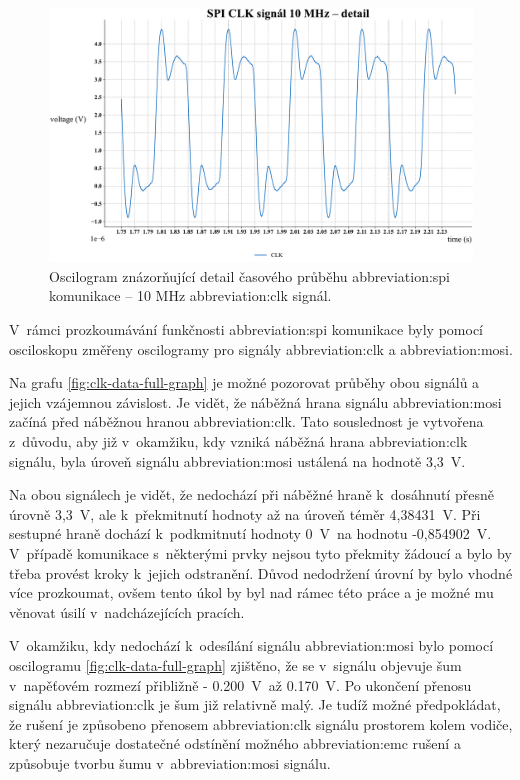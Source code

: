 \documentclass[a4paper, twoside, 11pt]{article}
\begin{document}
	\begin{figure}[htbp!]
		\centering
		\includegraphics[width=1\textwidth]{src/python-graph/spi-osciloscope-data/pdf/clk-mid-graph.pdf}
		\caption{Oscilogram znázorňující detail časového průběhu \gls{abbreviation:spi} komunikace – 10 MHz \gls{abbreviation:clk} signál.}
		\label{fig:clk-mid-graph}
	\end{figure}



	V~rámci prozkoumávání funkčnosti \gls{abbreviation:spi} komunikace byly pomocí osciloskopu změřeny oscilogramy pro signály \textcolor{ctublue}{\gls{abbreviation:clk}} a \textcolor{ctured}{\gls{abbreviation:mosi}}.\par
	Na grafu \ref{fig:clk-data-full-graph} je možné pozorovat průběhy obou signálů a jejich vzájemnou závislost. Je vidět, že náběžná hrana signálu \gls{abbreviation:mosi} začíná před náběžnou hranou \gls{abbreviation:clk}. Tato souslednost je vytvořena z~důvodu, aby již v~okamžiku, kdy vzniká náběžná hrana \textcolor{ctublue}{\gls{abbreviation:clk}} signálu, byla úroveň signálu \textcolor{ctured}{\gls{abbreviation:mosi}} ustálená na hodnotě 3,3~V.\par
	Na obou signálech je vidět, že nedochází při náběžné hraně k~dosáhnutí přesně úrovně 3,3~V, ale k~překmitnutí hodnoty až na úroveň téměr 4,38431~V. Při sestupné hraně dochází k~podkmitnutí hodnoty 0~V~na hodnotu -0,854902~V. V~případě komunikace s~některými prvky nejsou tyto překmity žádoucí a bylo by třeba provést kroky k~jejich odstranění. Důvod nedodržení úrovní by bylo vhodné více prozkoumat, ovšem tento úkol by byl nad rámec této práce a je možné mu věnovat úsilí v~nadcházejících pracích.\par
	V~okamžiku, kdy nedochází k~odesílání signálu \textcolor{ctured}{\gls{abbreviation:mosi}} bylo pomocí oscilogramu \ref{fig:clk-data-full-graph} zjištěno, že se v~signálu objevuje šum v~napěťovém rozmezí přibližně - 0.200~V~až 0.170~V. Po ukončení přenosu signálu \textcolor{ctublue}{\gls{abbreviation:clk}} je šum již relativně malý. Je tudíž možné předpokládat, že rušení je způsobeno přenosem \textcolor{ctublue}{\gls{abbreviation:clk}} signálu prostorem kolem vodiče, který nezaručuje dostatečné odstínění možného \gls{abbreviation:emc} rušení a způsobuje tvorbu šumu v~\textcolor{ctured}{\gls{abbreviation:mosi}} signálu.
\end{document}
